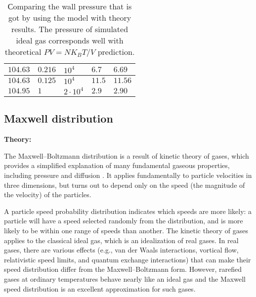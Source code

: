 \documentclass[12pt,twoside]{article}
\begin{document}
\begin{table}[H]
\begin{tabular}{|l|l|l|l|l|}
            \hline
            $104.63$                         & $0.216$                                   & $10^4$                    & $6.7$                                 & $6.69$                                 \\
            \hline
            $104.63$                         & $0.125$                                   & $10^4$                    & $11.5$                                & $11.56$                                \\
            \hline
            $104.95$                         & $1$                                       & $2 \cdot 10^4$            & $2.9$                                 & $2.90$                                 \\
            \hline
        \end{tabular}
        \caption{Сomparing the wall pressure that is got by using the model with theory results.
        The pressure of simulated ideal gas corresponds well with theoretical $PV = N K_B T / V$ prediction.}
    \end{table}

    \subsection{Maxwell distribution}

    \textbf{Theory: }

    \indent The Maxwell–Boltzmann distribution is a result of kinetic theory of gases,
    which provides a simplified explanation of many fundamental gaseous properties, including pressure and diffusion \cite{aldor2013power}.
    It applies fundamentally to particle velocities in three dimensions, but turns out to depend only on the speed (the magnitude of the velocity) of the particles.

    \indent A particle speed probability distribution indicates which speeds are more likely: a particle will have a speed selected randomly from the distribution,
    and is more likely to be within one range of speeds than another. The kinetic theory of gases applies to the classical ideal gas, which is an idealization of real gases.
    In real gases, there are various effects (e.g., van der Waals interactions, vortical flow, relativistic speed limits, and quantum exchange interactions)
    that can make their speed distribution differ from the Maxwell–Boltzmann form. However, rarefied gases at ordinary temperatures behave nearly like an ideal gas
    and the Maxwell speed distribution is an excellent approximation for such gases.
\end{document}
